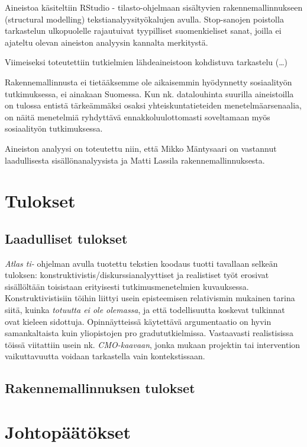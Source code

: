 \documentclass[a4paper,11pt,finnish]{article}
\begin{document}
Aineistoa käsiteltiin RStudio - tilasto-ohjelmaan sisältyvien
rakennemallinnukseen (structural modelling) tekstianalyysityökalujen
avulla. Stop-sanojen poistolla tarkastelun ulkopuolelle rajautuivat
tyypilliset suomenkieliset sanat, joilla ei ajateltu olevan aineiston
analyysin kannalta merkitystä.

Viimeiseksi toteutettiin tutkielmien lähdeaineistoon kohdistuva
tarkastelu (\ldots{})

Rakennemallinnusta ei tietääksemme ole aikaisemmin hyödynnetty
sosiaalityön tutkimuksessa, ei ainakaan Suomessa. Kun nk. datalouhinta
suurilla aineistoilla on tulossa entistä tärkeämmäksi osaksi
yhteiskuntatieteiden menetelmäarsenaalia, on näitä menetelmiä ryhdyttävä
ennakkoluulottomasti soveltamaan myös sosiaalityön tutkimuksessa.

Aineiston analyysi on toteutettu niin, että Mikko Mäntysaari on
vastannut laadullisesta sisällönanalyysista ja Matti Lassila
rakennemallinnuksesta.

\section*{Tulokset}

\subsection*{Laadulliset tulokset}

\emph{Atlas ti-} ohjelman avulla tuotettu tekstien koodaus tuotti
tavallaan selkeän tuloksen: konstruktivistis/diskurssianalyyttiset ja
realistiset työt erosivat sisällöltään toisistaan erityisesti
tutkimusmenetelmien kuvauksessa. Konstruktivistisiin töihin liittyi
usein episteemisen relativismin mukainen tarina siitä, kuinka
\emph{totuutta ei ole olemassa}, ja että todellisuutta koskevat
tulkinnat ovat kieleen sidottuja. Opinnäytteissä käytettävä
argumentaatio on hyvin samankaltaista kuin yliopistojen pro
gradututkielmissa. Vastaavasti realistisissa töissä viitattiin usein nk.
\emph{CMO-kaavaan}, jonka mukaan projektin tai intervention
vaikuttavuutta voidaan tarkastella vain kontekstissaan.

\subsection*{Rakennemallinnuksen tulokset}



\section*{Johtopäätökset}






\end{document}
